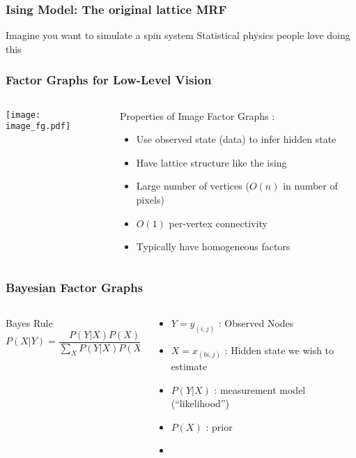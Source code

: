 \documentclass{beamer}
\begin{document}
\begin{frame}
  \frametitle{Ising Model: The original lattice MRF}
  Imagine you want to simulate a spin system
  Statistical physics people love doing this

\end{frame}


\begin{frame} 
  \frametitle{Factor Graphs for Low-Level Vision}
  \begin{columns}
    \begin{column}{5cm}
      \texttt{[image: image\_fg.pdf]}
    \end{column}
    \begin{column}{5cm}
      Properties of Image Factor Graphs \cite{Freeman_Markov_1999}: 
      \begin{itemize}
      \item Use observed state (data) to infer hidden state
      \item Have lattice structure like the ising
      \item Large number of vertices ($O(n)$ in number of pixels)
      \item $O(1)$ per-vertex connectivity
      \item Typically have homogeneous factors
      \end{itemize}
    \end{column}
  \end{columns}
\end{frame}

\begin{frame}
\frametitle{Bayesian Factor Graphs}
\begin {columns}
  \begin{column}{5cm}
    \begin{block}{Bayes Rule} 
      \begin{equation*}
        P(X | Y ) = \frac{P(Y | X) P(X)}{\sum_XP(Y|X)P(X)}
      \end{equation*}
    \end{block}
  \end{column}
  \begin{column}{5cm}
    \begin{itemize}
    \item $Y = {y_{(i, j)}}$ : Observed Nodes
    \item $X = {x_{(bi, j)}}$ : Hidden state we wish to estimate
    \item $P(Y | X) $ : measurement model (``likelihood'')
    \item $P(X) $ : prior 
    \item 
    \end{itemize}
  \end{column}
\end{columns}
\end{frame}
\end{document}
